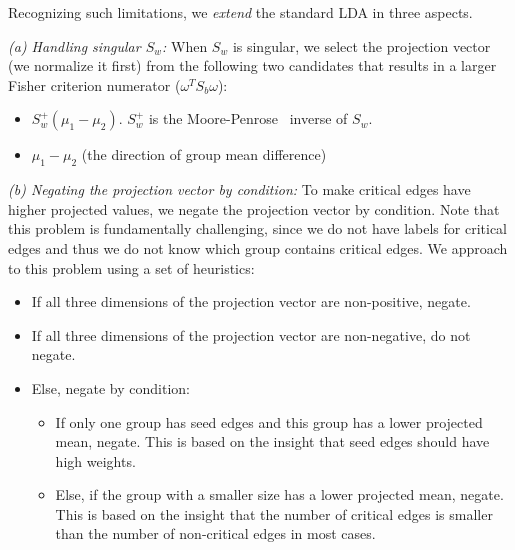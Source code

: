 Recognizing such limitations, we \emph{extend} the standard LDA in three aspects.

\emph{(a) Handling singular $S_w$:}
When $S_w$ is singular, we select the projection vector (we normalize it first) from the following two candidates that results in a larger Fisher criterion numerator (\ie $\omega^TS_b\omega$):

\begin{itemize}[noitemsep, topsep=1pt, partopsep=1pt, listparindent=\parindent, leftmargin=*]

    \item $S_w^{+}(\mu_1-\mu_2)$. $S_w^{+}$ is the Moore-Penrose~\cite{albert1972regression} inverse of $S_w$. 
    
    \item $\mu_1-\mu_2$ (\ie the direction of group mean difference)
\end{itemize}

\emph{(b) Negating the projection vector by condition:}
To make critical edges have higher projected values, we negate the projection vector by condition.
Note that this problem is fundamentally challenging, since we do not have labels for critical edges and thus we do not know which group contains critical edges. We approach to this problem using a set of heuristics:

\begin{itemize}[noitemsep, topsep=1pt, partopsep=1pt, listparindent=\parindent, leftmargin=*]

\item If all three dimensions of the projection vector are non-positive, negate.
\item If all three dimensions of the projection vector are non-negative, do not negate.
\item Else, 
negate by condition:

\begin{itemize}[noitemsep, topsep=1pt, partopsep=1pt, listparindent=\parindent, leftmargin=*]
    \item If only one group has seed edges and this group has a lower projected mean, negate. 
    This is based on the insight that seed edges should have high weights.
    
    \item Else, if the group with a smaller size has a lower projected mean, negate.
    This is based on the insight that the number of critical edges is smaller than the number of non-critical edges in most cases.
\end{itemize}
\end{itemize}


